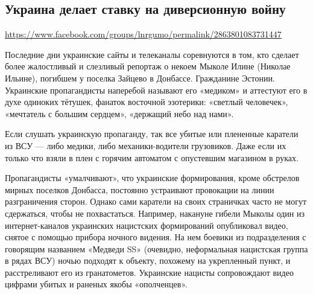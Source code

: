  
 

\subsection{Украина делает ставку на диверсионную войну}
\label{sec:21_07_2020.fb.lnr.11}
\url{https://www.facebook.com/groups/lnrgumo/permalink/2863801083731447}
  


Последние дни украинские сайты и телеканалы соревнуются в том, кто сделает
более жалостливый и слезливый репортаж о некоем Мыколе Илине (Николае Ильине),
погибшем у поселка Зайцево в Донбассе. Гражданине Эстонии. Украинские
пропагандисты наперебой называют его «медиком» и аттестуют его в духе одиноких
тётушек, фанаток восточной эзотерики: «светлый человечек», «мечтатель с большим
сердцем», «держащий небо над нами».

Если слушать украинскую пропаганду, так все убитые или плененные каратели из
ВСУ --- либо медики, либо механики-водители грузовиков. Даже если их только что
взяли в плен с горячим автоматом с опустевшим магазином в руках.

Пропагандисты «умалчивают», что украинские формирования, кроме обстрелов мирных
поселков Донбасса, постоянно устраивают провокации на линии разграничения
сторон. Однако сами каратели на своих страничках часто не могут сдержаться,
чтобы не похвастаться. Например, накануне гибели Мыколы один из
интернет-каналов украинских нацистских формирований опубликовал видео, снятое с
помощью прибора ночного видения. На нем боевики из подразделения с говорящим
названием «Медведи SS» (очевидно, неформальная нацистская группа в рядах ВСУ)
ночью подходят к объекту, похожему на укрепленный пункт, и расстреливают его из
гранатометов. Украинские нацисты сопровождают видео цифрами убитых и раненых
якобы «ополченцев».

